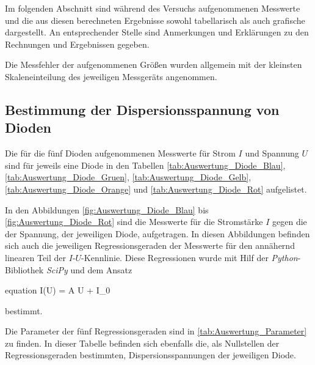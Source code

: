 Im folgenden Abschnitt sind während des Versuchs aufgenommenen Messwerte
und die aus diesen berechneten Ergebnisse sowohl tabellarisch als auch grafische 
dargestellt. An entsprechender Stelle sind Anmerkungen und Erklärungen zu den Rechnungen 
und Ergebnissen gegeben. 

Die Messfehler der aufgenommenen Größen wurden allgemein mit der kleinsten 
Skaleneinteilung des jeweiligen Messgeräts angenommen.



\subsection{Bestimmung der Dispersionsspannung von Dioden}

	Die für die fünf Dioden aufgenommenen Messwerte für Strom $I$ und Spannung $U$
	sind für jeweils eine Diode in den Tabellen \ref{tab:Auswertung_Diode_Blau},
	\ref{tab:Auswertung_Diode_Gruen}, \ref{tab:Auswertung_Diode_Gelb},
	 \ref{tab:Auswertung_Diode_Orange} und \ref{tab:Auswertung_Diode_Rot} aufgelistet.
	
	In den Abbildungen \ref{fig:Auswertung_Diode_Blau} bis \ref{fig:Auswertung_Diode_Rot}
	sind die
	Messwerte für die Stromstärke $I$ gegen die der Spannung, der jeweiligen Diode, 
	aufgetragen. In diesen Abbildungen befinden sich auch die jeweiligen Regressionsgeraden 
	der Messwerte für den annähernd linearen Teil der $I$-$U$-Kennlinie. Diese Regressionen
	wurde mit Hilf der \emph{Python}-Bibliothek \emph{SciPy} \cite{SciPy} und dem Ansatz
	\begin{empheq}{equation}
		I(U) = A \cdot U + I_{0}
	\end{empheq}  
	bestimmt.
	
	Die Parameter der fünf Regressionsgeraden sind in \cref{tab:Auswertung_Parameter} zu 
	finden. In dieser Tabelle befinden sich ebenfalls die, als Nullstellen der 
	Regressionsgeraden bestimmten, Dispersionsspannungen der jeweiligen Diode.
	
	
	  
	
	
	  
	
	
